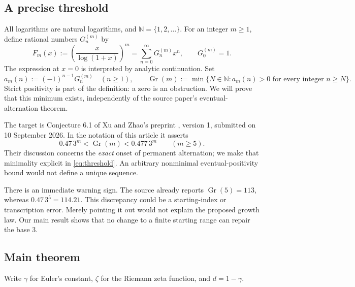 \documentclass[11pt]{article}
\numberwithin{equation}{section}
\theoremstyle{definition}
\newcommand{\Gr}{\operatorname{Gr}}
\newcommand{\N}{\mathbb N}
\begin{document}
\subsection{A precise threshold}
All logarithms are natural logarithms, and $\N=\{1,2,\ldots\}$. For an integer
$m\ge1$, define rational numbers $G_n^{(m)}$ by
\begin{equation}\label{eq:gf}
 F_m(x):=\left(\frac{x}{\log(1+x)}\right)^m
       =\sum_{n=0}^{\infty}G_n^{(m)}x^n,
 \qquad G_0^{(m)}=1.
\end{equation}
The expression at $x=0$ is interpreted by analytic continuation.
Set
\begin{equation}\label{eq:threshold}
 a_m(n):=(-1)^{n-1}G_n^{(m)}\quad(n\ge1),\qquad
 \Gr(m):=\min\{N\in\N:a_m(n)>0\text{ for every integer }n\ge N\}.
\end{equation}
Strict positivity is part of the definition: a zero is an obstruction.
We will prove that this minimum exists, independently of the source
paper's eventual-alternation theorem.

The target is Conjecture 6.1 of Xu and Zhao's preprint
\cite{XZ2026}, version 1, submitted on 10 September 2026. In the notation
of this article it asserts
\begin{equation}\label{eq:conjecture}
 0.47\,3^m<\Gr(m)<0.477\,3^m\qquad(m\ge5).
\end{equation}
Their discussion concerns the \emph{exact} onset of permanent alternation;
we make that minimality explicit in \eqref{eq:threshold}. An arbitrary
nonminimal eventual-positivity bound would not define a unique sequence.

There is an immediate warning sign. The source already reports
$\Gr(5)=113$, whereas $0.47\,3^5=114.21$. This discrepancy could be a
starting-index or transcription error. Merely pointing it out would not
explain the proposed growth law. Our main result shows that no change to
a finite starting range can repair the base $3$.

\subsection{Main theorem}
Write $\gamma$ for Euler's constant, $\zeta$ for the Riemann zeta function,
and $d=1-\gamma$.
\end{document}
